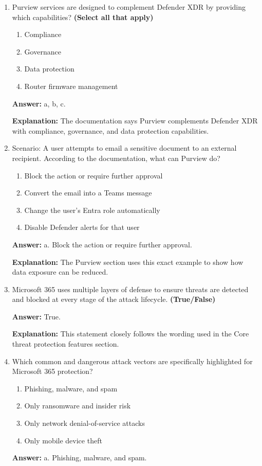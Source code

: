 \documentclass[10pt]{article}
\begin{document}
\begin{enumerate}[leftmargin=*]
\textbf{Explanation:} These integration scenarios are explicitly described in the Purview integration section.

\item Purview services are designed to complement Defender XDR by providing which capabilities? \textbf{(Select all that apply)}
\begin{enumerate}[label=\alph*., leftmargin=1.5em]
\item Compliance
\item Governance
\item Data protection
\item Router firmware management
\end{enumerate}
\textbf{Answer:} a, b, c.

\textbf{Explanation:} The documentation says Purview complements Defender XDR with compliance, governance, and data protection capabilities.

\item Scenario: A user attempts to email a sensitive document to an external recipient. According to the documentation, what can Purview do?
\begin{enumerate}[label=\alph*., leftmargin=1.5em]
\item Block the action or require further approval
\item Convert the email into a Teams message
\item Change the user’s Entra role automatically
\item Disable Defender alerts for that user
\end{enumerate}
\textbf{Answer:} a. Block the action or require further approval.

\textbf{Explanation:} The Purview section uses this exact example to show how data exposure can be reduced.

\item Microsoft 365 uses multiple layers of defense to ensure threats are detected and blocked at every stage of the attack lifecycle. \textbf{(True/False)}

\textbf{Answer:} True.

\textbf{Explanation:} This statement closely follows the wording used in the Core threat protection features section.

\item Which common and dangerous attack vectors are specifically highlighted for Microsoft 365 protection?
\begin{enumerate}[label=\alph*., leftmargin=1.5em]
\item Phishing, malware, and spam
\item Only ransomware and insider risk
\item Only network denial-of-service attacks
\item Only mobile device theft
\end{enumerate}
\textbf{Answer:} a. Phishing, malware, and spam.


\end{enumerate}
\end{document}
